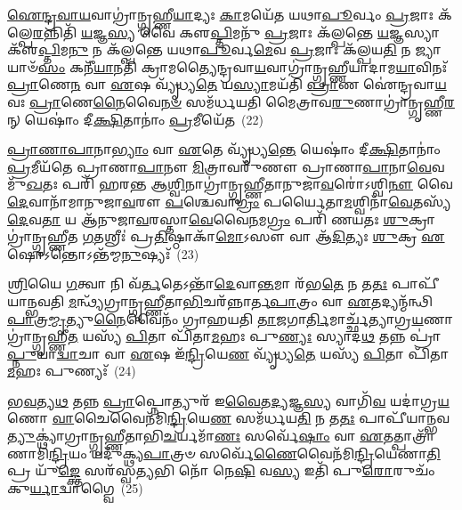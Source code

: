 {\anuvakamend[{𑌤𑌸𑍍𑌮𑌾॑𑌦𑍍𑌗𑌾\-\ul{𑌯}\-𑌤𑍍𑌰𑍍𑌯𑍇\-\ul{𑌕𑌾}\-𑌨𑍍𑌨𑌪᳴\-\ul{𑌞𑍍𑌚𑌾}\-𑌶𑌚𑍍𑌚᳴}]}%

\-\ul{𑌐}\-\-\ul{𑌨𑍍𑌦𑍍𑌰}\-\-\ul{𑌵𑌾}\-\-\ul{𑌯}\-𑌵𑌾𑌗𑍍𑌰𑌾॑𑌨𑍍𑌗𑍃𑌹𑍍𑌣𑍀\-\ul{𑌯𑌾}\-𑌦𑍍𑌯𑌃 \ul{𑌕𑌾}\-𑌮𑌯𑍇᳴𑌤 𑌯𑌥𑌾\-\ul{𑌪𑍂}\-𑌰𑍍𑌵𑌂 \ul{𑌪𑍍𑌰}\-𑌜𑌾𑌃 𑌕᳴𑌲𑍍𑌪𑍇\-\ul{𑌰}\-𑌨𑍍𑌨𑌿𑌤𑌿᳴ \ul{𑌯}\-𑌜𑍍𑌞\-\ul{𑌸𑍍𑌯} 𑌵𑍈 𑌕𑍢\-\ul{𑌪𑍍𑌤𑌿}\-𑌮𑌨𑍁᳴ \ul{𑌪𑍍𑌰}\-𑌜𑌾𑌃 𑌕᳴𑌲𑍍𑌪𑌨𑍍𑌤𑍇 \ul{𑌯}\-𑌜𑍍𑌞𑌸𑍍𑌯𑌾𑌕𑍢᳴\-\ul{𑌪𑍍𑌤𑌿}\-𑌮\-\ul{𑌨𑍁} 𑌨 𑌕᳴𑌲𑍍𑌪𑌨𑍍𑌤𑍇 𑌯𑌥𑌾\-\ul{𑌪𑍂}\-𑌰𑍍𑌵\-\ul{𑌮𑍇}\-𑌵 \ul{𑌪𑍍𑌰}\-𑌜𑌾𑌃 𑌕᳴𑌲𑍍𑌪𑌯\-\ul{𑌤𑌿} 𑌨 𑌜𑍍𑌯𑌾𑌯𑌾𑍞᳴\-\ul{𑌸𑌂} 𑌕𑌨𑍀᳴\-\ul{𑌯𑌾}\-𑌨𑌤𑌿᳴ 𑌕𑍍𑌰𑌾𑌮𑌤𑍍𑌯𑍈𑌨𑍍𑌦𑍍𑌰𑌵𑌾\-\ul{𑌯}\-𑌵𑌾𑌗𑍍𑌰𑌾॑𑌨𑍍𑌗𑍃𑌹𑍍𑌣𑍀𑌯𑌾𑌦𑌾𑌮\-\ul{𑌯𑌾}\-𑌵𑌿𑌨𑌃᳴ \ul{𑌪𑍍𑌰𑌾}\-𑌣𑍇\-\ul{𑌨} 𑌵𑌾 \ul{𑌏}\-𑌷 𑌵𑍍𑌯𑍃᳴𑌧𑍍𑌯\-\ul{𑌤𑍇} 𑌯\-\ul{𑌸𑍍𑌯𑌾}\-𑌮𑌯᳴𑌤𑌿 \ul{𑌪𑍍𑌰𑌾}\-𑌣 𑌐॑𑌨𑍍𑌦𑍍𑌰𑌵𑌾\-\ul{𑌯}\-𑌵𑌃 \ul{𑌪𑍍𑌰𑌾}\-𑌣𑍇\-\ul{𑌨𑍈}\-𑌵𑍈\-\ul{𑌨}\-\-\ul{𑍞} 𑌸𑌮᳴𑌰𑍍𑌧𑌯𑌤𑌿 𑌮𑍈𑌤𑍍𑌰𑌾𑌵\-\ul{𑌰𑍁}\-𑌣𑌾𑌗𑍍𑌰𑌾॑𑌨𑍍𑌗𑍃𑌹𑍍𑌣𑍀\-\ul{𑌰}\-𑌨𑍍 𑌯𑍇𑌷𑌾𑌂॑ 𑌦𑍀\-\ul{𑌕𑍍𑌷𑌿}\-𑌤𑌾𑌨𑌾𑌂॑ \ul{𑌪𑍍𑌰}\-𑌮𑍀𑌯𑍇᳴𑌤~(22)

\-\ul{𑌪𑍍𑌰𑌾}\-\-\ul{𑌣𑌾}\-\-\ul{𑌪𑌾}\-𑌨𑌾\-\ul{𑌭𑍍𑌯𑌾𑌂} 𑌵𑌾 \ul{𑌏}\-𑌤𑍇 𑌵𑍍𑌯𑍃᳴𑌧𑍍𑌯\-\ul{𑌨𑍍𑌤𑍇} 𑌯𑍇𑌷𑌾𑌂॑ 𑌦𑍀\-\ul{𑌕𑍍𑌷𑌿}\-𑌤𑌾𑌨𑌾𑌂॑ \ul{𑌪𑍍𑌰}\-𑌮𑍀𑌯᳴𑌤𑍇 𑌪𑍍𑌰𑌾𑌣𑌾\-\ul{𑌪𑌾}\-𑌨𑍗 \ul{𑌮𑌿}\-𑌤𑍍𑌰𑌾𑌵𑌰𑍁᳴𑌣𑍗 𑌪𑍍𑌰𑌾𑌣𑌾\-\ul{𑌪𑌾}\-𑌨𑌾\-\ul{𑌵𑍇}\-𑌵 𑌮𑍁᳴\-\ul{𑌖}\-𑌤𑌃 𑌪𑌰𑌿᳴ 𑌹𑌰𑌨𑍍𑌤 𑌆\-\ul{𑌶𑍍𑌵𑌿}\-𑌨𑌾𑌗𑍍𑌰𑌾॑𑌨𑍍𑌗𑍃𑌹𑍍𑌣𑍀𑌤𑌾𑌨𑍁𑌜𑌾\-\ul{𑌵}\-𑌰𑍋॑\-𑌽𑌶𑍍𑌵𑌿\-\ul{𑌨𑍗} 𑌵𑍈 \ul{𑌦𑍇}\-𑌵𑌾𑌨𑌾᳴𑌮𑌾𑌨𑍁𑌜𑌾\-\ul{𑌵}\-𑌰𑍗 \ul{𑌪}\-𑌶𑍍𑌚𑍇𑌵𑌾\-\ul{𑌗𑍍𑌰𑌂} 𑌪𑌰𑍍𑌯𑍈𑌤𑌾\-\ul{𑌮}\-𑌶𑍍𑌵𑌿𑌨𑌾᳴\-\ul{𑌵𑍇}\-𑌤𑌸𑍍𑌯᳴ \ul{𑌦𑍇}\-𑌵\-\ul{𑌤𑌾} 𑌯 𑌆᳴𑌨𑍁𑌜𑌾\-\ul{𑌵}\-𑌰𑌸𑍍𑌤𑌾\-\ul{𑌵𑍇}\-𑌵𑍈\-\ul{𑌨}\-𑌮\-\ul{𑌗𑍍𑌰𑌂} 𑌪𑌰𑌿᳴ 𑌣𑌯𑌤𑌃 \ul{𑌶𑍁}\-𑌕𑍍𑌰𑌾𑌗𑍍𑌰𑌾॑𑌨𑍍𑌗𑍃𑌹𑍍𑌣𑍀𑌤 \ul{𑌗}\-𑌤𑌶𑍍𑌰𑍀𑌃॑ 𑌪𑍍𑌰\-\ul{𑌤𑌿}\-𑌷𑍍𑌠𑌾𑌕𑌾᳴\-\ul{𑌮𑍋}\-\-𑌽𑌸𑍗 𑌵𑌾 𑌆᳴\-\ul{𑌦𑌿}\-𑌤𑍍𑌯𑌃 \ul{𑌶𑍁}\-𑌕𑍍𑌰 \ul{𑌏}\-𑌷𑍋\-𑌽𑌨𑍍𑌤𑍋\-𑌽𑌨𑍍𑌤᳴𑌮𑍍𑌮\-\ul{𑌨𑍁}\-𑌷𑍍𑌯𑌃᳴~(23)

\-\ul{𑌶𑍍𑌰𑌿}\-𑌯𑍈 \ul{𑌗}\-𑌤𑍍𑌵𑌾 𑌨𑌿 𑌵᳴\-\ul{𑌰𑍍𑌤}\-𑌤𑍇\-𑌽𑌨𑍍𑌤𑌾᳴\-\ul{𑌦𑍇}\-𑌵𑌾\-\ul{𑌨𑍍𑌤}\-𑌮𑌾 𑌰᳴𑌭\-\ul{𑌤𑍇} 𑌨 𑌤\-\ul{𑌤𑌃} 𑌪𑌾𑌪𑍀᳴𑌯𑌾𑌨𑍍𑌭𑌵𑌤𑌿 \ul{𑌮}\-𑌨𑍍𑌥𑍍𑌯᳴𑌗𑍍𑌰𑌾𑌨𑍍𑌗𑍃𑌹𑍍𑌣𑍀𑌤𑌾\-\ul{𑌭𑌿}\-𑌚𑌰᳴𑌨𑍍𑌨𑌾𑌰𑍍𑌤\-\ul{𑌪𑌾}\-𑌤𑍍𑌰𑌂 𑌵𑌾 \ul{𑌏}\-𑌤𑌦𑍍𑌯𑌨𑍍𑌮᳴𑌨𑍍𑌥𑌿\-\ul{𑌪𑌾}\-𑌤𑍍𑌰\-\ul{𑌮𑍍𑌮𑍃}\-𑌤𑍍𑌯𑍁\-\ul{𑌨𑍈}\-𑌵𑍈𑌨𑌂᳴ 𑌗𑍍𑌰𑌾𑌹𑌯𑌤𑌿 \ul{𑌤𑌾}\-𑌜𑌗𑌾\-\ul{𑌰𑍍𑌤𑌿}\-𑌮𑌾𑌰𑍍𑌚𑍍𑌛᳴𑌤𑍍𑌯𑌾𑌗𑍍𑌰\-\ul{𑌯}\-𑌣𑌾𑌗𑍍𑌰𑌾॑𑌨𑍍𑌗𑍃𑌹𑍍𑌣𑍀\-\ul{𑌤} 𑌯𑌸𑍍𑌯᳴ \ul{𑌪𑌿}\-𑌤𑌾 𑌪𑌿᳴𑌤𑌾\-\ul{𑌮}\-𑌹𑌃 𑌪𑍁\-\ul{𑌣𑍍𑌯𑌃} 𑌸𑍍𑌯𑌾𑌦\-\ul{𑌥} 𑌤𑌨𑍍𑌨 𑌪𑍍𑌰𑌾॑\-\ul{𑌪𑍍𑌨𑍁}\-𑌯𑌾\-\ul{𑌦𑍍𑌵𑌾}\-𑌚𑌾 𑌵𑌾 \ul{𑌏}\-𑌷 𑌇᳴\-\ul{𑌨𑍍𑌦𑍍𑌰𑌿}\-𑌯𑍇\-\ul{𑌣} 𑌵𑍍𑌯𑍃᳴𑌧𑍍𑌯\-\ul{𑌤𑍇} 𑌯𑌸𑍍𑌯᳴ \ul{𑌪𑌿}\-𑌤𑌾 𑌪𑌿᳴𑌤𑌾\-\ul{𑌮}\-𑌹𑌃 𑌪𑍁𑌣𑍍𑌯𑌃᳴~(24)

𑌭\-\ul{𑌵}\-𑌤𑍍𑌯\-\ul{𑌥} 𑌤𑌨𑍍𑌨 \ul{𑌪𑍍𑌰𑌾}\-𑌪𑍍𑌨𑍋𑌤𑍍𑌯𑍁𑌰᳴ 𑌇\-\ul{𑌵𑍈}\-𑌤\-\ul{𑌦𑍍𑌯}\-𑌜𑍍𑌞\-\ul{𑌸𑍍𑌯} 𑌵𑌾𑌗𑌿᳴\-\ul{𑌵} 𑌯𑌦𑌾॑𑌗𑍍𑌰\-\ul{𑌯}\-𑌣𑍋 \ul{𑌵𑌾}\-𑌚𑍈𑌵𑍈𑌨᳴𑌮𑌿\-\ul{𑌨𑍍𑌦𑍍𑌰𑌿}\-𑌯𑍇\-\ul{𑌣} 𑌸𑌮᳴𑌰𑍍𑌧𑌯\-\ul{𑌤𑌿} 𑌨 𑌤\-\ul{𑌤𑌃} 𑌪𑌾𑌪𑍀᳴𑌯𑌾𑌨𑍍𑌭𑌵\-\-\ul{𑌤𑍍𑌯𑍁}\-𑌕𑍍𑌥𑍍𑌯𑌾॑𑌗𑍍𑌰𑌾𑌨𑍍𑌗𑍃𑌹𑍍𑌣𑍀𑌤𑌾𑌭𑌿\-\ul{𑌚}\-𑌰𑍍𑌯𑌮𑌾᳴\-\ul{𑌣𑌃} 𑌸𑌰𑍍𑌵𑍇᳴\-\ul{𑌷𑌾𑌂} 𑌵𑌾 \ul{𑌏}\-𑌤𑌤𑍍𑌪𑌾𑌤𑍍𑌰𑌾᳴𑌣𑌾𑌮𑌿\-\ul{𑌨𑍍𑌦𑍍𑌰𑌿}\-𑌯𑌂 𑌯𑌦𑍁᳴𑌕𑍍𑌥𑍍𑌯\-\ul{𑌪𑌾}\-𑌤𑍍𑌰𑍞 𑌸𑌰𑍍𑌵𑍇᳴\-\ul{𑌣𑍈}\-𑌵𑍈𑌨᳴𑌮𑌿\-\ul{𑌨𑍍𑌦𑍍𑌰𑌿}\-𑌯𑍇𑌣𑌾\-\ul{𑌤𑌿} 𑌪𑍍𑌰 𑌯𑍁᳴\-\ul{𑌙𑍍𑌕𑍍𑌤𑍇} 𑌸𑌰᳴𑌸𑍍𑌵\-\ul{𑌤𑍍𑌯}\-𑌭𑌿 𑌨𑍋᳴ 𑌨𑍇\-\ul{𑌷𑌿} 𑌵\-\ul{𑌸𑍍𑌯} 𑌇𑌤𑌿᳴ 𑌪𑍁\-\ul{𑌰𑍋}\-𑌰𑍁𑌚𑌂᳴ 𑌕𑍁\-\ul{𑌰𑍍𑌯𑌾}\-𑌦𑍍𑌵𑌾𑌗𑍍𑌵𑍈~(25)

